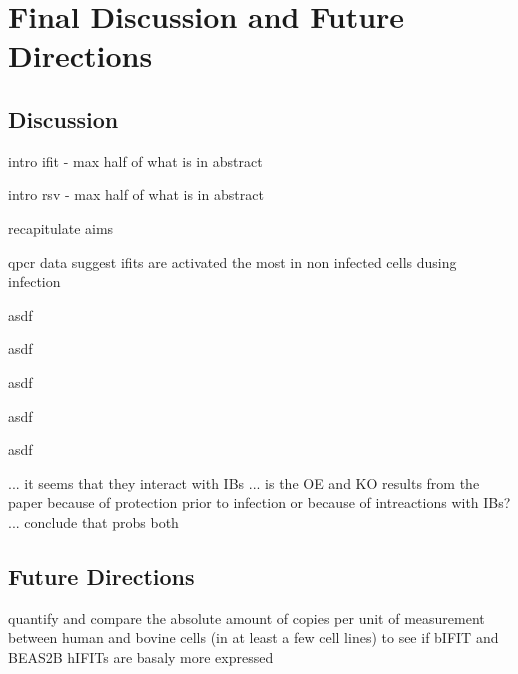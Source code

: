 \chapter{Final Discussion and Future Directions}
\section{Discussion} \label{sec:Discussion}
intro ifit - max half of what is in abstract

intro rsv - max half of what is in abstract

recapitulate aims

qpcr data suggest ifits are activated the most in non infected cells dusing infection

asdf

asdf

asdf

asdf

asdf


... it seems that they interact with IBs ... is the OE and KO results from the paper because of protection prior to infection or because of intreactions with IBs? ... conclude that probs both


\section{Future Directions} \label{sec:Future Directions}
quantify and compare the absolute amount of copies per unit of measurement between human and bovine cells (in at least a few cell lines) to see if bIFIT and BEAS2B hIFITs are basaly more expressed

